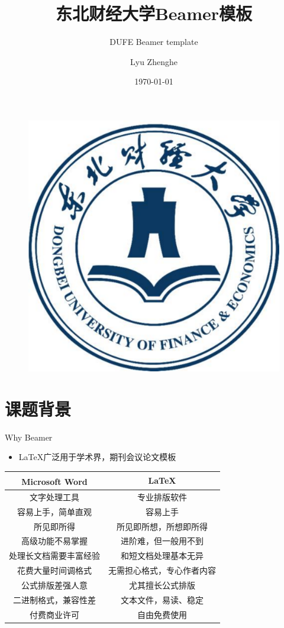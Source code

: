 \documentclass{beamer}
\author[Lyu Zhenghe]{Lyu Zhenghe}
\title{东北财经大学\textrm{Beamer}模板}
\subtitle{\textrm{DUFE Beamer template}}
\institute{东北财经大学金融学院}
\date{\today}
\begin{document}
\begin{frame}
    \titlepage
    \begin{figure}[htpb]
        \begin{center}
            \includegraphics[width=0.2\linewidth]{Dufe1.pdf}
        \end{center}
    \end{figure}
\end{frame}

\begin{frame}
    \tableofcontents[sectionstyle=show,subsectionstyle=show/shaded/hide,subsubsectionstyle=show/shaded/hide]
\end{frame}


\section{课题背景}

\begin{frame}{Why Beamer}
	\begin{itemize}
		\item \LaTeX 广泛用于学术界，期刊会议论文模板
	\end{itemize}
	\begin{table}[h]
		\centering
		\begin{tabular}{c|c}
			Microsoft\textsuperscript{\textregistered}  Word & \LaTeX \\
			\hline
			文字处理工具 & 专业排版软件 \\
			容易上手，简单直观 & 容易上手 \\
			所见即所得 & 所见即所想，所想即所得 \\
			高级功能不易掌握 & 进阶难，但一般用不到 \\
			处理长文档需要丰富经验 & 和短文档处理基本无异 \\
			花费大量时间调格式 & 无需担心格式，专心作者内容 \\
			公式排版差强人意 & 尤其擅长公式排版 \\
			二进制格式，兼容性差 & 文本文件，易读、稳定 \\
			付费商业许可 & 自由免费使用 \\
		\end{tabular}
	\end{table}
\end{frame}
\end{document}
